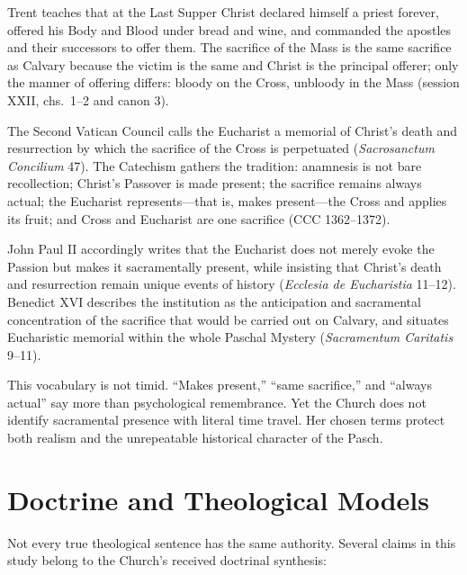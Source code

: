 \begin{deepstudy}
Trent teaches that at the Last Supper Christ declared himself a priest forever,
offered his Body and Blood under bread and wine, and commanded the apostles and
their successors to offer them. The sacrifice of the Mass is the same sacrifice
as Calvary because the victim is the same and Christ is the principal offerer;
only the manner of offering differs: bloody on the Cross, unbloody in the Mass
(session XXII, chs.~1--2 and canon 3).

The Second Vatican Council calls the Eucharist a memorial of Christ's death and
resurrection by which the sacrifice of the Cross is perpetuated
(\emph{Sacrosanctum Concilium} 47). The Catechism gathers the tradition:
anamnesis is not bare recollection; Christ's Passover is made present; the
sacrifice remains always actual; the Eucharist represents---that is, makes
present---the Cross and applies its fruit; and Cross and Eucharist are one
sacrifice (CCC 1362--1372).

John Paul II accordingly writes that the Eucharist does not merely evoke the
Passion but makes it sacramentally present, while insisting that Christ's death
and resurrection remain unique events of history
(\emph{Ecclesia de Eucharistia} 11--12). Benedict XVI describes the institution
as the anticipation and sacramental concentration of the sacrifice that would
be carried out on Calvary, and situates Eucharistic memorial within the whole
Paschal Mystery (\emph{Sacramentum Caritatis} 9--11).

This vocabulary is not timid. ``Makes present,'' ``same sacrifice,'' and
``always actual'' say more than psychological remembrance. Yet the Church does
not identify sacramental presence with literal time travel. Her chosen terms
protect both realism and the unrepeatable historical character of the Pasch.

\section{Doctrine and Theological Models}

Not every true theological sentence has the same authority. Several claims in
this study belong to the Church's received doctrinal synthesis:


\end{deepstudy}
